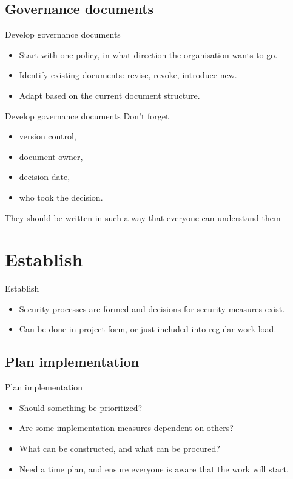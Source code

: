 \documentclass{beamer}
\begin{document}
\subsection{Governance documents}
\begin{frame}{Develop governance documents}
  \begin{itemize}
    \item Start with one policy, in what direction the organisation wants to go.
    \item Identify existing documents: revise, revoke, introduce new.
    \item Adapt based on the current document structure.
  \end{itemize}
\end{frame}
\begin{frame}{Develop governance documents}
  Don't forget
  \begin{itemize}
    \item version control,
    \item document owner,
    \item decision date,
    \item who took the decision.
  \end{itemize}
  They should be written in such a way that everyone can understand them
\end{frame}

\section{Establish}
\begin{frame}{Establish}
  \begin{itemize}
    \item Security processes are formed and decisions for security measures
      exist.
    \item Can be done in project form, or just included into regular work load.
  \end{itemize}
\end{frame}

\subsection{Plan implementation}
\begin{frame}{Plan implementation}
  \begin{itemize}
    \item Should something be prioritized?
    \item Are some implementation measures dependent on others?
    \item What can be constructed, and what can be procured?
    \item Need a time plan, and ensure everyone is aware that the work will
      start.
  \end{itemize}
\end{frame}
\end{document}
